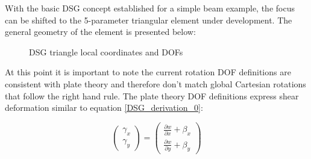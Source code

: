 With the basic DSG concept established for a simple beam example, the focus can be shifted to the 5-parameter triangular element under development. The general geometry of the element is presented below:

\begin{figure}[H]
	\centering
	\caption{\label{DSG_derivation_pic2}DSG triangle local coordinates and DOFs \cite{Ngu13}}
\end{figure}

At this point it is important to note the current rotation DOF definitions are consistent with plate theory and therefore don't match global Cartesian rotations that follow the right hand rule. The plate theory DOF definitions express shear deformation similar to equation \ref{DSG_derivation_0}:

\begin{equation} 
\begin{pmatrix}
\gamma_x \\
\gamma_y
\end{pmatrix}
=
\begin{pmatrix}
\frac{\partial w}{\partial x} +  \beta_x \\
\frac{\partial w}{\partial y} +  \beta_y
\end{pmatrix}
\label{DSG_derivation_5}
\end{equation}

